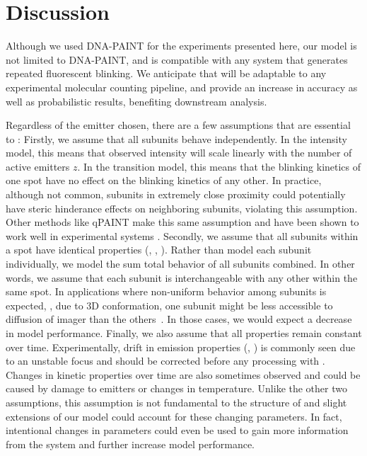 \section{Discussion} \label{discussion}

Although we used DNA-PAINT for the experiments presented here, our model is not
limited to DNA-PAINT, and is compatible with any system that generates repeated
fluorescent blinking.
  We anticipate that \ours will be adaptable to any experimental molecular
  counting pipeline, and provide an increase in accuracy as well as
  probabilistic results, benefiting downstream analysis.

Regardless of the emitter chosen, there are a few assumptions that are
essential to \ours:
  Firstly, we assume that all subunits behave independently.
  In the intensity model, this means that observed intensity will scale
  linearly with the number of active emitters $z$.
  In the transition model, this means that the blinking kinetics of one spot
  have no effect on the blinking kinetics of any other.
  In practice, although not common, subunits in extremely close proximity could
  potentially have steric hinderance effects on neighboring subunits, violating
  this assumption.
  Other methods like qPAINT make this same assumption and have been shown to
  work well in experimental systems \citep{fischer_quantitative_2021,
  jayasinghe_true_2018}. 
  Secondly, we assume that all subunits within a spot have identical properties
  (\pon, \poff, \re).
  Rather than model each subunit individually, we model the sum total behavior
  of all subunits combined. In other words, we assume that each subunit is
  interchangeable with any other within the same spot.
  In applications where non-uniform behavior among subunits is expected, \eg,
  due to 3D conformation, one subunit might be less accessible to diffusion of
  imager than the others~\citep{civitci_2020}. In those cases, we would expect
  a decrease in model performance.
  Finally, we also assume that all properties remain constant over time. 
  Experimentally, drift in emission properties (\re, \rb) is commonly seen due
  to an unstable focus and should be corrected before any processing with
  \ours.
  Changes in kinetic properties over time are also sometimes observed and could
  be caused by damage to emitters or changes in temperature. 
  Unlike the other two assumptions, this assumption is not fundamental to the
  structure of \ours and slight extensions of our model could account for these
  changing parameters.
  In fact, intentional changes in parameters could even be used to gain more
  information from the system and further increase model performance.

